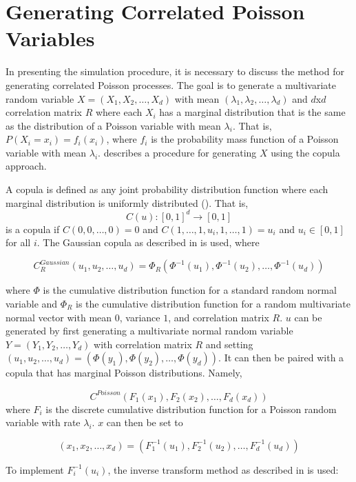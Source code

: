 \section{Generating Correlated Poisson Variables}\label{ch:generate_correlated_poisson}
In presenting the simulation procedure, it is necessary to discuss the method for generating correlated Poisson processes. The goal is to generate a multivariate random variable $X = (X_1, X_2, \ldots, X_d)$ with mean $(\lambda_1, \lambda_2, \ldots, \lambda_{d})$ and $d$x$d$ correlation matrix $R$ where each $X_i$ has a marginal distribution that is the same as the distribution of a Poisson variable with mean $\lambda_i$. That is, $P(X_i = x_i) = f_i(x_i)$, where $f_i$ is the probability mass function of a Poisson variable with mean $\lambda_i$. \cite{A8} describes a procedure for generating $X$ using the copula approach. 

A copula is defined as any joint probability distribution function where each marginal distribution is uniformly distributed (\cite{B1}). That is, 
$$C(u): [0,1]^d \to [0,1]$$ 
is a copula if $C(0, 0, \ldots, 0) = 0$ and $C(1, \ldots, 1, u_i, 1, \ldots, 1) = u_i$ and $u_i \in [0,1]$ for all $i$. The Gaussian copula as described in \cite{A8} is used, where

$$ C_R^{Gaussian}(u_1, u_2, \ldots, u_d) = \Phi_{R}(\Phi^{-1}(u_1), \Phi^{-1}(u_2), \ldots,  \Phi^{-1}(u_d))$$

where $\Phi$ is the cumulative distribution function for a standard random normal variable and $\Phi_{R}$ is the cumulative distribution function for a random multivariate normal vector with mean $0$, variance $1$, and correlation matrix $R$. $u$ can be generated by first generating a multivariate normal random variable $Y = (Y_1,Y_2, \ldots, Y_d)$ with correlation matrix $R$ and setting $(u_1, u_2, \ldots, u_d) = (\Phi(y_1), \Phi(y_2), \ldots,  \Phi(y_d))$. It can then be paired with a copula that has marginal Poisson distributions. Namely,

$$ C^{Poisson}(F_1(x_1), F_2(x_2), \ldots, F_d(x_d))$$ where $F_i$ is the discrete cumulative distribution function for a Poisson random variable with rate $\lambda_i$. $x$ can then be set to

$$(x_1, x_2, \ldots, x_d) = (F^{-1}_1(u_1), F^{-1}_2(u_2), \ldots, F^{-1}_d(u_d))$$

To implement $F^{-1}_i(u_i)$, the inverse transform method as described in \cite{B1} is used:
\newline


